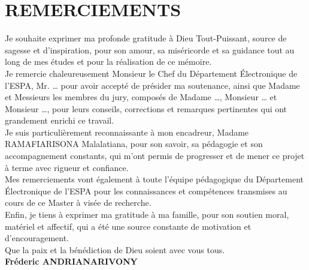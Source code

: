 \chapter*{\large REMERCIEMENTS} %
\thispagestyle{empty} %
\begin{flushleft} %
Je souhaite exprimer ma profonde gratitude à Dieu Tout-Puissant, source de sagesse et d'inspiration, pour son amour, sa miséricorde et sa guidance tout au long de mes études et pour la réalisation de ce mémoire.\vspace{8pt}\\

Je remercie chaleureusement Monsieur le Chef du Département Électronique de l'ESPA, Mr. … pour avoir accepté de présider ma soutenance, ainsi que Madame et Messieurs les membres du jury, composés de Madame …, Monsieur … et Monsieur …, pour leurs conseils, corrections et remarques pertinentes qui ont grandement enrichi ce travail.\vspace{8pt}\\

Je suis particulièrement reconnaissante à mon encadreur, Madame RAMAFIARISONA Malalatiana, pour son savoir, sa pédagogie et son accompagnement constants, qui m'ont permis de progresser et de mener ce projet à terme avec rigueur et confiance.\vspace{8pt}\\

Mes remerciements vont également à toute l'équipe pédagogique du Département Électronique de l'ESPA pour les connaissances et compétences transmises au cours de ce Master à visée de recherche.\vspace{8pt}\\

Enfin, je tiens à exprimer ma gratitude à ma famille, pour son soutien moral, matériel et affectif, qui a été une source constante de motivation et d'encouragement.\vspace{8pt}\\

Que la paix et la bénédiction de Dieu soient avec vous tous.\vspace{8pt}\\

\medskip
\hfill\textbf{Fréderic ANDRIANARIVONY}
\end{flushleft}